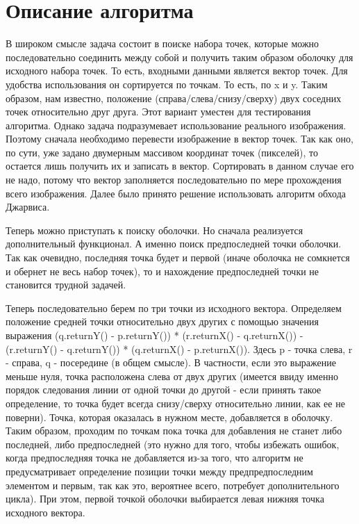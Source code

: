 \documentclass{report}
\begin{document}
\section*{Описание алгоритма}
\par В широком смысле задача состоит в поиске набора точек, которые можно последовательно соединить между собой и получить таким образом оболочку для исходного набора точек. То есть, входными данными является вектор точек. Для удобства использования он сортируется по точкам. То есть, по x и y. Таким образом, нам известно, положение (справа/слева/снизу/сверху) двух соседних точек относительно друг друга. Этот вариант уместен для тестирования алгоритма. Однако задача подразумевает использование реального изображения. Поэтому сначала необходимо перевести изображение в вектор точек. Так как оно, по сути, уже задано двумерным массивом координат точек (пикселей), то остается лишь получить их и записать в вектор. Сортировать в данном случае его не надо, потому что вектор заполняется последовательно по мере прохождения всего изображения. Далее было принято решение использовать алгоритм обхода Джарвиса.
\par Теперь можно приступать к поиску оболочки. Но сначала реализуется дополнительный функционал. А именно поиск предпоследней точки оболочки. Так как очевидно, последняя точка будет и первой (иначе оболочка не сомкнется и обернет не весь набор точек), то и нахождение предпоследней точки не становится трудной задачей.
\par Теперь последовательно берем по три точки из исходного вектора. Определяем положение средней точки относительно двух других с помощью значения выражения (q.returnY() - p.returnY()) *
    (r.returnX() - q.returnX()) - (r.returnY() - q.returnY()) * (q.returnX() - p.returnX()). Здесь p - точка слева, r - справа, q - посередине (в общем смысле). В частности, если это выражение меньше нуля, точка расположена слева от двух других (имеется ввиду именно порядок следования линии от одной точки до другой - если принять такое определение, то точка будет всегда снизу/сверху относительно линии, как ее не поверни). Точка, которая оказалась в нужном месте, добавляется в оболочку. Таким образом, проходим по точкам пока точка для добавления не станет либо последней, либо предпоследней (это нужно для того, чтобы избежать ошибок, когда предпоследняя точка не добавляется из-за того, что алгоритм не предусматривает определение позиции точки между предпредпоследним элементом и первым, так как это, вероятнее всего, потребует дополнительного цикла). При этом, первой точкой оболочки выбирается левая нижняя точка исходного вектора.
\end{document}
